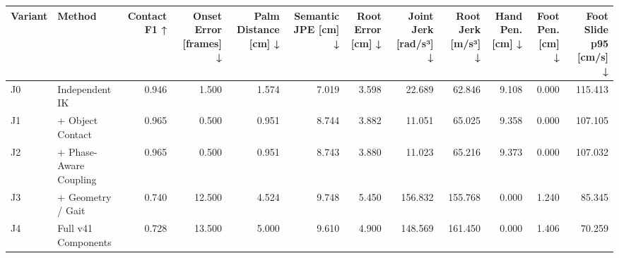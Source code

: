 \begin{tabular}{llrrrrrrrrrr}
\toprule
Variant & Method & Contact F1 ↑ & Onset Error [frames] ↓ & Palm Distance [cm] ↓ & Semantic JPE [cm] ↓ & Root Error [cm] ↓ & Joint Jerk [rad/s³] ↓ & Root Jerk [m/s³] ↓ & Hand Pen. [cm] ↓ & Foot Pen. [cm] ↓ & Foot Slide p95 [cm/s] ↓ \\
\midrule
J0 & Independent IK & 0.946 & 1.500 & 1.574 & 7.019 & 3.598 & 22.689 & 62.846 & 9.108 & 0.000 & 115.413 \\
J1 & + Object Contact & 0.965 & 0.500 & 0.951 & 8.744 & 3.882 & 11.051 & 65.025 & 9.358 & 0.000 & 107.105 \\
J2 & + Phase-Aware Coupling & 0.965 & 0.500 & 0.951 & 8.743 & 3.880 & 11.023 & 65.216 & 9.373 & 0.000 & 107.032 \\
J3 & + Geometry / Gait & 0.740 & 12.500 & 4.524 & 9.748 & 5.450 & 156.832 & 155.768 & 0.000 & 1.240 & 85.345 \\
J4 & Full v41 Components & 0.728 & 13.500 & 5.000 & 9.610 & 4.900 & 148.569 & 161.450 & 0.000 & 1.406 & 70.259 \\
\bottomrule
\end{tabular}
